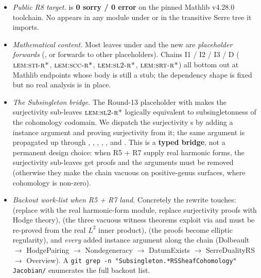 \begin{itemize}
\item \emph{Public R8 target.}   is \textbf{0 sorry / 0 error}
  on the pinned Mathlib v4.28.0 toolchain.  No 
  appears in any module under 
  or in the transitive Serre tree it imports.

\item \emph{Mathematical content.}  Most leaves under
   and the new
   are
  \emph{placeholder forwards} (, or
  forwards to other placeholders).  Chains I1 / I2 / I3 / D
  ($\textsc{lem:sti-r*}$, $\textsc{lem:scc-r*}$,
  $\textsc{lem:sl2-r*}$, $\textsc{lem:srt-r*}$) all bottom out at
  Mathlib endpoints whose body is still a stub; the dependency
  shape is fixed but no real analysis is in place.

\item \emph{The Subsingleton bridge.}  The Round-13 placeholder
   with
   makes the surjectivity
  sub-leaves $\textsc{lem:sl2-r*}$ logically equivalent to
  subsingletonness of the cohomology codomain.  We dispatch the
  surjectivity s by adding a
   instance
  argument and proving surjectivity from it; the same argument
  is propagated up through ,
  , ,
  , , and
  .  This is a
  \textbf{typed bridge}, not a permanent design choice: when R5 +
  R7 supply real harmonic forms, the surjectivity sub-leaves get
  proofs and the  arguments must be
  removed (otherwise they make the chain vacuous on positive-genus
  surfaces, where cohomology is non-zero).

\item \emph{Backout work-list when R5 + R7 land.}  Concretely the
  rewrite touches:  (replace
   with the real harmonic-form
  module, replace surjectivity proofs with Hodge theory),
   (the three vacuous witness theorems
  exploit  via  and
  must be re-proved from the real $L^{2}$ inner product),
   (the 
  proofs become elliptic regularity), and \emph{every} added
   instance argument
  along the chain (Dolbeault $\to$ HodgePairing $\to$
  Nondegeneracy $\to$ DatumExists $\to$ SerreDualityRS $\to$
  Overview).  A \texttt{git grep -n
  "Subsingleton.*RSSheafCohomology" Jacobian/} enumerates the
  full backout list.


\end{itemize}
